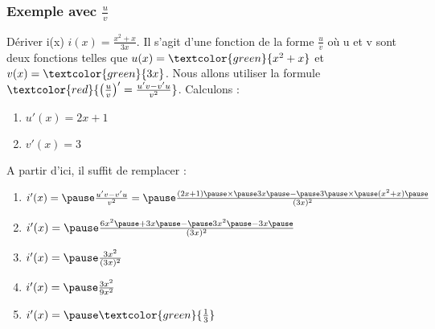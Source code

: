 \documentclass[t]{beamer}
\begin{document}
\begin{frame}
\frametitle{Exemple avec $\frac{u}{v}$ }
\pause
\begin{block}{Dériver i(x)}
	$i(x) = \frac{x^2 + x}{3x}$. \pause Il s'agit d'une fonction de la forme $\frac{u}{v}$ \pause où u et v sont deux fonctions \pause telles que $u(x) = \textcolor{green}{x^2 + x}$ \pause et $v(x) = \textcolor{green}{3x}$. \pause Nous allons utiliser la formule $\textcolor{red}{\left( \frac{u}{v} \right)' = \frac{u'v - v'u}{v^2}}$. \pause Calculons :
	\pause
	\begin{enumerate}{}
		\item<+-> \(u'(x)= 2x + 1 \)
		\item<+-> \(v'(x) = 3 \) 
	\end{enumerate}
	\pause
	A partir d'ici, il suffit de remplacer : \pause
	\begin{enumerate}[]
	\item \(i'(x) = \pause \frac{u'v - v'u}{v^2} = \pause \frac{(2x+1) \pause \times \pause 3x \pause - \pause 3 \pause \times \pause (x^2+x) \pause}{(3x)^2}\)
	\pause
	\item \(i'(x) = \pause \frac{6x^2 \pause + 3x \pause - \pause 3x^2 \pause - 3x \pause}{(3x)^2} \)
	\pause
	\item \(i'(x) = \pause \frac{3x^2}{(3x)^2} \)
	\pause
	\item \(i'(x) = \pause \frac{3x^2}{9x^2} \)
	\pause
	\item \(i'(x) = \pause \textcolor{green}{\frac{1}{3}} \)
	\end{enumerate}	
\end{block}
\end{frame}
\end{document}
